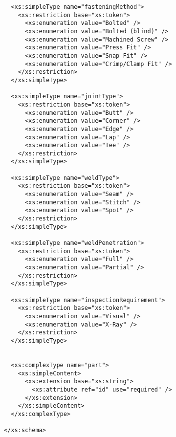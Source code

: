 \begin{lstlisting}
  <xs:simpleType name="fasteningMethod">
    <xs:restriction base="xs:token">
      <xs:enumeration value="Bolted" />
      <xs:enumeration value="Bolted (blind)" />
      <xs:enumeration value="Machined Screw" />
      <xs:enumeration value="Press Fit" />
      <xs:enumeration value="Snap Fit" />
      <xs:enumeration value="Crimp/Clamp Fit" />
    </xs:restriction>
  </xs:simpleType>

  <xs:simpleType name="jointType">
    <xs:restriction base="xs:token">
      <xs:enumeration value="Butt" />
      <xs:enumeration value="Corner" />
      <xs:enumeration value="Edge" />
      <xs:enumeration value="Lap" />
      <xs:enumeration value="Tee" />
    </xs:restriction>
  </xs:simpleType>

  <xs:simpleType name="weldType">
    <xs:restriction base="xs:token">
      <xs:enumeration value="Seam" />
      <xs:enumeration value="Stitch" />
      <xs:enumeration value="Spot" />
    </xs:restriction>
  </xs:simpleType>

  <xs:simpleType name="weldPenetration">
    <xs:restriction base="xs:token">
      <xs:enumeration value="Full" />
      <xs:enumeration value="Partial" />
    </xs:restriction>
  </xs:simpleType>

  <xs:simpleType name="inspectionRequirement">
    <xs:restriction base="xs:token">
      <xs:enumeration value="Visual" />
      <xs:enumeration value="X-Ray" />
    </xs:restriction>
  </xs:simpleType>


  <xs:complexType name="part">
    <xs:simpleContent>
      <xs:extension base="xs:string">
        <xs:attribute ref="id" use="required" />
      </xs:extension>
    </xs:simpleContent>
  </xs:complexType>

</xs:schema>
\end{lstlisting}
